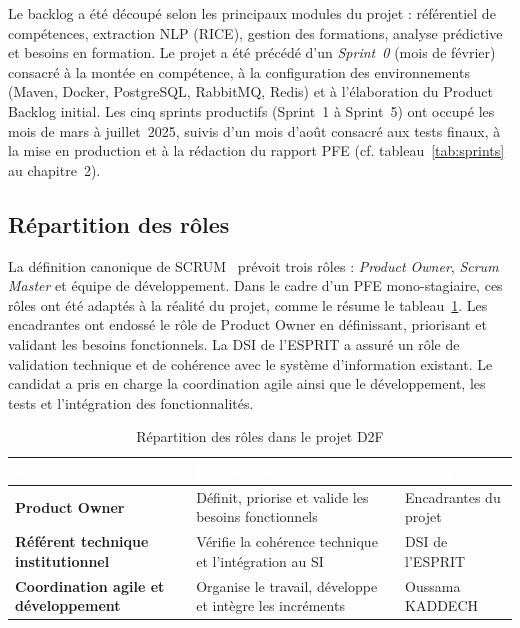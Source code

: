 \documentclass[12pt,a4paper]{report}
\renewcommand{\thead}[1]{\cellcolor{espritblue}\textcolor{white}{\textbf{#1}}}
\begin{document}
Le backlog a été découpé selon les principaux modules du projet : référentiel de
compétences, extraction NLP (RICE), gestion des formations, analyse prédictive
et besoins en formation. Le projet a été précédé d'un \emph{Sprint~0} (mois de
février) consacré à la montée en compétence, à la configuration des
environnements (Maven, Docker, PostgreSQL, RabbitMQ, Redis) et à l'élaboration
du Product Backlog initial. Les cinq sprints productifs (Sprint~1 à Sprint~5)
ont occupé les mois de mars à juillet~2025, suivis d'un mois d'août consacré
aux tests finaux, à la mise en production et à la rédaction du rapport PFE
(cf. tableau~\ref{tab:sprints} au chapitre~2).

\subsection{Répartition des rôles}

La définition canonique de SCRUM~\cite{schwaber2020scrum,sutherland2014scrum}
prévoit trois rôles : \textit{Product Owner}, \textit{Scrum Master} et équipe
de développement. Dans le cadre d'un PFE mono-stagiaire, ces rôles ont été
adaptés à la réalité du projet, comme le résume le tableau~\ref{tab:roles_scrum}.
Les encadrantes ont endossé le rôle de Product Owner en définissant, priorisant
et validant les besoins fonctionnels. La DSI de l'ESPRIT a assuré un rôle de
validation technique et de cohérence avec le système d'information existant. Le
candidat a pris en charge la coordination agile ainsi que le développement, les
tests et l'intégration des fonctionnalités.

\begin{table}[H]
\centering
\caption{Répartition des rôles dans le projet D2F}
\label{tab:roles_scrum}
{\small\renewcommand{\arraystretch}{1.15}
\begin{tabularx}{\textwidth}{>{\bfseries}p{3.5cm} p{5.5cm} X}
\toprule
\thead{Rôle} & \thead{Responsabilité} & \thead{Acteur} \\
\midrule
Product Owner & Définit, priorise et valide les besoins fonctionnels & Encadrantes du projet \\
Référent technique institutionnel & Vérifie la cohérence technique et l'intégration au SI & DSI de l'ESPRIT \\
Coordination agile et développement & Organise le travail, développe et intègre les incréments & Oussama KADDECH \\
\bottomrule
\end{tabularx}}
\end{table}
\end{document}
